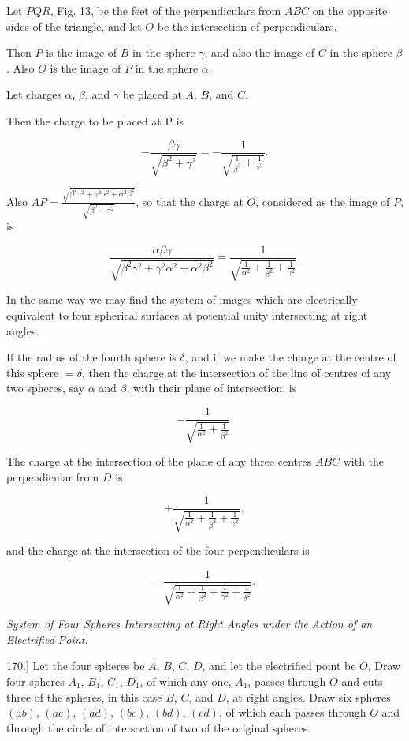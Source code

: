 \documentclass[11pt,a4paper]{article}
\begin{document}
Let $PQR$, Fig. 13, be the feet of the perpendiculars from $ABC$ on
the opposite sides of the triangle, and let $O$ be the intersection of
perpendiculars.

Then $P$ is the image of $B$ in the sphere $\gamma$, and also the image
of $C$ in the sphere $\beta$. Also $O$ is the image of $P$ in the
sphere $\alpha$.

Let charges $\alpha$, $\beta$, and $\gamma$ be placed at $A$, $B$, and
$C$.

Then the charge to be placed at P is

\[
-\frac{\beta\gamma}{\sqrt{\beta^2+\gamma^2}}
=-\frac{1}{\sqrt{\frac{1}{\beta^2}+\frac{1}{\gamma^2}}}.
\]

Also
$AP=\frac{\sqrt{\beta^2\gamma^2+\gamma^2\alpha^2+\alpha^2\beta^2}}
{\sqrt{\beta^2+\gamma^2}}$, so that the charge at $O$, considered as
the image of $P$, is

\[
\frac{\alpha\beta\gamma}
{\sqrt{\beta^2\gamma^2+\gamma^2\alpha^2+\alpha^2\beta^2}}
=\frac{1}{\sqrt{\frac{1}{\alpha^2}+\frac{1}{\beta^2}+\frac{1}{\gamma^2}}}.
\]

In the same way we may find the system of images which are electrically
equivalent to four spherical surfaces at potential unity intersecting
at right angles.

If the radius of the fourth sphere is $\delta$, and if we make the
charge at the centre of this sphere $=\delta$, then the charge at the
intersection of the line of centres of any two spheres, say $\alpha$
and $\beta$, with their plane of intersection, is

\[
-\frac{1}{\sqrt{\frac{1}{\alpha^2}+\frac{1}{\beta^2}}}.
\]

The charge at the intersection of the plane of any three centres $ABC$
with the perpendicular from $D$ is

\[
+\frac{1}{\sqrt{\frac{1}{\alpha^2}+\frac{1}{\beta^2}+\frac{1}{\gamma^2}}},
\]

and the charge at the intersection of the four perpendiculars is

\[
-\frac{1}{\sqrt{\frac{1}{\alpha^2}+\frac{1}{\beta^2}+\frac{1}{\gamma^2}+\frac{1}{\delta^2}}}.
\]

\begin{center}
\textit{System of Four Spheres Intersecting at Right Angles under the
Action of an Electrified Point.}
\end{center}

170.] Let the four spheres be $A$, $B$, $C$, $D$, and let the
electrified point be $O$. Draw four spheres $A_1$, $B_1$, $C_1$,
$D_1$, of which any one, $A_1$, passes through $O$ and cuts three of
the spheres, in this case $B$, $C$, and $D$, at right angles. Draw six
spheres $(ab)$, $(ac)$, $(ad)$, $(bc)$, $(bd)$, $(cd)$, of which each
passes through $O$ and through the circle of intersection of two of the
original spheres.
\end{document}
